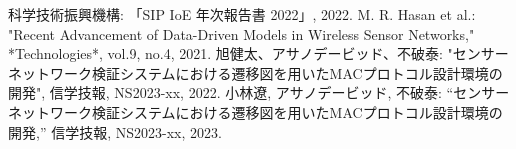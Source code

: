 \documentclass[technicalreport]{ieicej}
\begin{document}

%
%

\begin{thebibliography}{99}
 科学技術振興機構: 「SIP IoE 年次報告書 2022」, 2022.
 M. R. Hasan et al.: "Recent Advancement of Data-Driven Models in Wireless Sensor Networks," *Technologies*, vol.9, no.4, 2021.
 旭健太、アサノデービッド、不破泰: "センサーネットワーク検証システムにおける遷移図を用いたMACプロトコル設計環境の開発", 信学技報, NS2023-xx, 2022.
 小林遼, アサノデービッド, 不破泰:
“センサーネットワーク検証システムにおける遷移図を用いたMACプロトコル設計環境の開発,”
信学技報, NS2023-xx, 2023.

\end{thebibliography}
\end{document}
